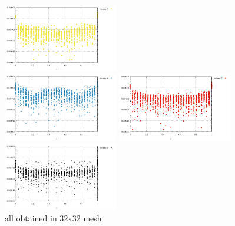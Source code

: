 \begin{center}
\includegraphics[width=5cm]{python_codes/fieldstone_12/results/rand/q4_error}\\
\includegraphics[width=5cm]{python_codes/fieldstone_12/results/rand/q6_error}
\includegraphics[width=5cm]{python_codes/fieldstone_12/results/rand/q7_error}
\includegraphics[width=5cm]{python_codes/fieldstone_12/results/rand/q8_error}\\
{\captionfont all obtained in 32x32 mesh}
\end{center}

